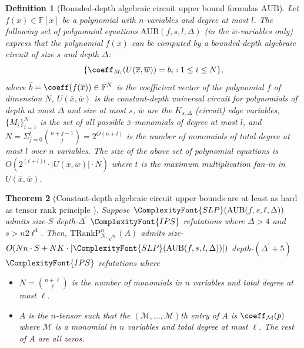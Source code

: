 \documentclass[11pt,letter]{article}
\newtheorem{theorem}{Theorem}[section]
\newtheorem{definition}[theorem]{Definition}
\theoremstyle{remark} %
\newcommand{\TRankP}{\mathrm{TRankP}} %
\newcommand{\AUB}{\mathrm{AUB}} %
\newcommand{\IPS}{%
    {
        \ComplexityFont{IPS} 
    }
}
\newcommand{\SLP}{ %
    {
        \ComplexityFont{SLP}
    }
}
\newcommand{\calM}{\mathcal{M}}
\begin{document}
{     \begin{definition}[Bounded-depth algebraic circuit upper bound formulas \mbox{$\AUB$}]
        \label{def: Constant-depth algebraic circuit upper bound formula}
         Let $f(\overline{x})\in \mathbb{F}[\overline{x}]$ be a polynomial with $n$-variables and degree at most $l$. The following set of polynomial equations $\AUB(f,s,l,\Delta)$ (in the $\overline{w}$-variables only) express that the polynomial $f(\overline{x})$ can be computed by a bounded-depth algebraic circuit of size $s$ and depth $\Delta$: 
         \[
            \{\coeff_{M_i} (U(\overline{x},\overline{w})) = b_i : 1\leq i \leq N\},
        \]
        where $\overline{b}=\coeff(f(\overline{x})) \in \mathbb{F}^N$ is the coefficient vector of the polynomial $f$ of dimension $N$, $U(\overline{x},\overline{w})$ is the constant-depth universal circuit for polynomials of depth at most $\Delta$ and size at most $s$, $\overline{w}$ are the $K_{s,\Delta}$ (circuit) edge variables, $\{M_i\}_{i=1}^N$ is the set of all possible $\overline{x}$-monomials of degree at most $l$, and $N=\Sigma_{j=0}^l \binom{n+j-1}{j}=2^{O(n+l)}$ is the number of monomials of total degree at most $l$ over $n$ variables. The size of the above set of polynomial equations is $O(2^{(t+l)l}\cdot |U(\overline{x},\overline{w})| \cdot N)$ where $t$ is the maximum multiplication fan-in in $U(\overline{x},\overline{w})$.\par 
    \end{definition}

    \begin{theorem}[Constant-depth algebraic circuit upper bounds are at least as hard as tensor rank principle \cite{GGLST25}]
        \label{theorem: reduction to TRankP}
        Suppose $\SLP(\AUB(f,s,\ell,\Delta))$ admits size-$S$ depth-$\Delta^\prime$ $\IPS$ refutations where $\Delta > 4$ and $s > n2 \ell^4$.
        Then, $\TRankP_{N,\sqrt{s}}^n(A)$ admits size-$O(Nn \cdot S + NK \cdot |\SLP(\AUB(f, s, l, \Delta))|)$ depth-$(\Delta^\prime+5)$ $\IPS$ refutations where
        \begin{itemize}
            \item $N = \binom{n+\ell}{\ell}$ is the number of monomials in $n$ variables and total degree at most $\ell$.
            \item $A$ is the $n$-tensor such that the $(\calM, \dots, \calM)$th entry of $A$ is $\coeff_\calM(p)$ where $\calM$ is a monomial in $n$ variables and total degree at most $\ell$. The rest of $A$ are all zeros. 
        \end{itemize}
    \end{theorem}

}
\end{document}
